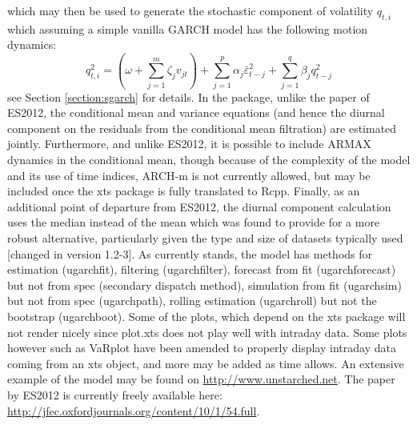 which may then be used to generate the stochastic component of volatility $q_{t,i}$ which assuming a simple vanilla GARCH model has the following motion dynamics:
\begin{equation}\label{mcs4}
q_{t,i}^2 = \left( {\omega  + \sum\limits_{j = 1}^m {{\zeta _j}{v_{jt}}} } \right) + \sum\limits_{j = 1}^p {{\alpha _j}\bar \varepsilon _{t - j}^2 + } \sum\limits_{j = 1}^q {{\beta _j}q_{t - j}^2}
\end{equation}
see Section \ref{section:sgarch} for details.
In the \verb@rugarch@ package, unlike the paper of ES2012, the conditional mean and variance equations (and hence the diurnal component on the residuals from the conditional mean filtration) are estimated jointly. Furthermore, and unlike ES2012, it is possible to include ARMAX dynamics in the conditional mean, though because of the complexity of the model and its use of time indices, ARCH-m is not currently allowed, but may be included once the xts package is fully translated to Rcpp. Finally, as an additional point of departure from ES2012, the diurnal component calculation uses the median instead of the mean which was found to provide for a more robust alternative, particularly given the type and size of datasets typically used [changed in version 1.2-3].
As currently stands, the model has methods for estimation (ugarchfit), filtering (ugarchfilter), forecast from fit (ugarchforecast) but not from spec (secondary dispatch method), simulation from fit (ugarchsim) but not from spec (ugarchpath), rolling estimation (ugarchroll) but not the bootstrap (ugarchboot). Some of the plots, which depend on the xts package will not render nicely since plot.xts does not play well with intraday data. Some plots however such as VaRplot have been amended to properly display intraday data coming from an xts object, and more may be added as time allows. An extensive example of the model may be found on \url{http://www.unstarched.net}.
The paper by ES2012 is currently freely available here: \url{http://jfec.oxfordjournals.org/content/10/1/54.full}.

